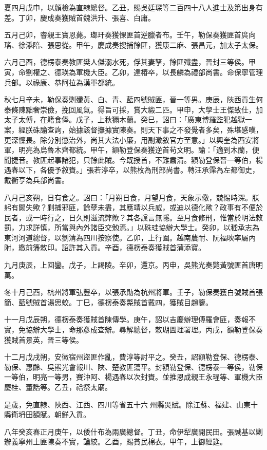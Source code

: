 \begin{pinyinscope}
夏四月戊申，以顏檢為直隸總督。乙丑，賜吳廷琛等二百四十八人進士及第出身有差。丁卯，慶成奏獲賊首魏洪升、張喜、白庸。

五月己卯，睿親王寶恩薨。瑯玕奏獲惈匪首逆臘者布。壬午，勒保奏獲匪首庹向瑤、徐添陪、張思從。甲午，慶成奏搜捕餘匪，獲康二麻、張昌元，加太子太保。

六月己酉，德楞泰奏教匪樊人傑溺水死，俘其妻孥，餘匪殲盡，晉封三等侯。甲寅，命劉權之、德瑛為軍機大臣。乙卯，達椿卒，以長麟為禮部尚書。命保寧管理兵部。以祿康、恭阿拉為漢軍都統。

秋七月辛未，勒保奏剿殲黃、白、青、藍四號賊匪，晉一等男。庚辰，陜西貢生何泰條陳黜奢崇儉，挽回風氣。得旨可採，賞大緞二匹。甲申，大學士王傑致仕，加太子太傅，在籍食俸。戊子，上秋獮木蘭。癸巳，詔曰：「廣東博羅監犯越獄一案，經朕硃諭查詢，始據該督撫據實陳奏。則天下事之不發覺者多矣，殊堪感嘆，更深懍畏。除分別懲治外，尚其大法小廉，用副澂敘官方至意。」以興奎為西安將軍，明亮為烏魯木齊都統。甲午，額勒登保奏獲逆首茍文明。諭：「適到木蘭，便聞捷音。教匪起事諸犯，只餘此賊。今既授首，不難肅清。額勒登保晉一等伯，楊遇春以下，各優予敘賚。」張若渟卒，以熊枚為刑部尚書。轉汪承霈為左都御史，戴衢亨為兵部尚書。

八月己亥朔，日有食之。詔曰：「月朔日食，月望月食，天象示儆，兢惕時深。朕躬有闕失歟？剿捕邪匪，餘孽未盡，其應靖以兵威，或迪以德化歟？政事有不便於民者，或一時行之，日久則滋流弊歟？其各讜言無隱。至月食修刑，惟當於明法敕罰，力求詳慎，所當與內外諸臣交勉焉。」以硃珪協辦大學士。癸卯，以嵇承志為東河河道總督，以劉清為四川按察使。乙卯，上行圍。越南農耐、阮福映率屬內附，繳前籓敕印。詔許其入貢。辛酉，德楞泰奏獲賊首蒲添寶。

九月庚辰，上回鑾。戊子，上謁陵。辛卯，還京。丙申，吳熊光奏斃黃號匪首唐明萬。

冬十月己酉，杭州將軍弘豐卒，以張承勛為杭州將軍。壬子，勒保奏獲白號賊首張簡、藍號賊首湯思蛟。丁巳，德楞泰奏斃賊首戴四，獲賊目趙鑒。

十一月戊辰朔，德楞泰奏獲賊首陳傳學。庚午，詔以吉慶辦理傅羅會匪，奏報不實，免協辦大學士，命那彥成查辦。尋解總督，敕瑚圖理署理。丙戌，額勒登保奏獲賊首景英，晉三等侯。

十二月戊戌朔，安徽宿州盜匪作亂，費淳等討平之。癸丑，詔額勒登保、德楞泰、勒保、惠齡、吳熊光會報川、陜、楚教匪蕩平。封額勒登保、德楞泰一等侯，勒保一等伯，明亮一等男，賽沖阿、楊遇春以次封賚。並推恩成親王永瑆等、軍機大臣慶桂、董誥等。乙丑，祫祭太廟。

是歲，免直隸、陜西、江西、四川等省五十六州縣災賦。除江蘇、福建、山東十縣衛坍田額賦。朝鮮入貢。

八年癸亥春正月庚午，以倭什布為兩廣總督。丁丑，命伊犁廣開民田。張誠基以剿辦義寧州土匪陳奏不實，論絞。乙酉，賜貧民棉衣。甲午，上御經筵。


\end{pinyinscope}
